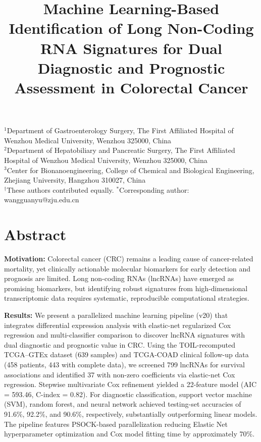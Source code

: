 \documentclass[11pt,a4paper]{article}
\title{Machine Learning-Based Identification of Long Non-Coding RNA Signatures for Dual Diagnostic and Prognostic Assessment in Colorectal Cancer}
\author{Zhuha Zhou$^{1,\dagger}$, Yongyu Bai$^{1,\dagger}$, Qigang Xue$^{2}$, Zhuxian Zhou$^{3}$, Shaolian Han$^{1,*}$^{\textrm{\href{https://orcid.org}{}}}$}
\date{}
\begin{document}
\maketitle

\begin{center}
$^1$Department of Gastroenterology Surgery, The First Affiliated Hospital of Wenzhou Medical University, Wenzhou 325000, China \\
$^2$Department of Hepatobiliary and Pancreatic Surgery, The First Affiliated Hospital of Wenzhou Medical University, Wenzhou 325000, China \\
$^3$Center for Bionanoengineering, College of Chemical and Biological Engineering, Zhejiang University, Hangzhou 310027, China \\[4pt]
$^\dagger$These authors contributed equally. \quad
$^*$Corresponding author: wangguanyu@zju.edu.cn
\end{center}

\section*{Abstract}

\textbf{Motivation:} Colorectal cancer (CRC) remains a leading cause of cancer-related mortality, yet clinically actionable molecular biomarkers for early detection and prognosis are limited. Long non-coding RNAs (lncRNAs) have emerged as promising biomarkers, but identifying robust signatures from high-dimensional transcriptomic data requires systematic, reproducible computational strategies.

\textbf{Results:} We present a parallelized machine learning pipeline (v20) that integrates differential expression analysis with elastic-net regularized Cox regression and multi-classifier comparison to discover lncRNA signatures with dual diagnostic and prognostic value in CRC. Using the TOIL-recomputed TCGA--GTEx dataset (639 samples) and TCGA-COAD clinical follow-up data (458 patients, 443 with complete data), we screened 799 lncRNAs for survival associations and identified 37 with non-zero coefficients via elastic-net Cox regression. Stepwise multivariate Cox refinement yielded a 22-feature model (AIC = 593.46, C-index = 0.82). For diagnostic classification, support vector machine (SVM), random forest, and neural network achieved testing-set accuracies of 91.6\%, 92.2\%, and 90.6\%, respectively, substantially outperforming linear models. The pipeline features PSOCK-based parallelization reducing Elastic Net hyperparameter optimization and Cox model fitting time by approximately 70\%.
\end{document}
